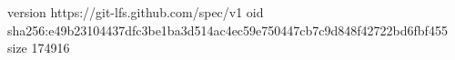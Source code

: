 version https://git-lfs.github.com/spec/v1
oid sha256:e49b23104437dfc3be1ba3d514ac4ec59e750447cb7c9d848f42722bd6fbf455
size 174916
